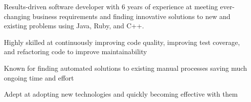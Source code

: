 %
    \begin{itemize*}
        \item Results-driven software developer with 6 years of experience at meeting ever-changing business requirements
            and finding innovative solutions to new and existing problems using Java, Ruby, and C++.
        \item Highly skilled at continuously improving code quality, improving test coverage, and refactoring code to improve maintainability
        \item Known for finding automated solutions to existing manual processes saving much ongoing time and effort
        \item Adept at adopting new technologies and quickly becoming effective with them
    \end{itemize*}
